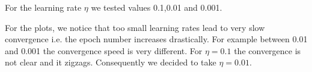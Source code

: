 \documentclass[10pt,a4paper,english]{article}
\begin{document}
For the learning rate $\eta$ we tested values 0.1,0.01 and 0.001.
\begin{figure}[!h]
    \centering
\end{figure}
For the plots, we notice that too small learning rates lead to very slow convergence i.e. the epoch number increases drastically.  
For example between 0.01 and 0.001 the convergence speed is very different. For $\eta=0.1$ the convergence is not clear and it zigzags.
Consequently we decided to take $\eta = 0.01$.
\end{document}

